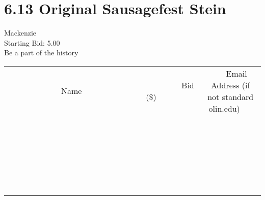 \documentclass[11pt]{article}
\begin{document}
					\section*{6.13 Original Sausagefest Stein}
					Mackenzie \\
					Starting Bid: 5.00 \\
					Be a part of the history \\
					[6ex]
					\begin{tabular}{c c c}
						~~~~~~~~~~~~~Name~~~~~~~~~~~~~ & ~~~~~~~~~Bid (\$)~~~~~~~~~ & ~~~Email Address (if not standard olin.edu)~~~ \\
				
 & & \\
\hline
 & & \\
\hline
 & & \\
\hline
 & & \\
\hline
 & & \\
\hline
 & & \\
\hline
 & & \\
\hline
 & & \\
\hline
 & & \\
\hline
 & & \\
\hline
 & & \\
\hline
 & & \\
\hline
 & & \\
\hline
 & & \\
\hline
 & & \\
\hline
 & & \\
\hline
 & & \\
\hline
 & & \\
\hline
 & & \\
\hline
 & & \\
\hline
 & & \\
\hline
 & & \\
\hline
 & & \\
\hline
 & & \\
\hline
 & & \\
\hline
 & & \\
\hline
					\end{tabular}
					\clearpage
				
\end{document}

